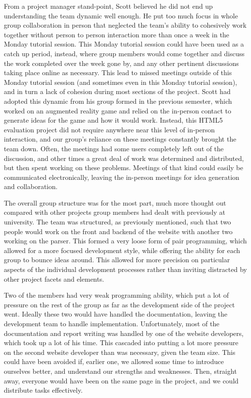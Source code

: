\documentclass[10pt]{article}
\begin{document}
From a project manager stand-point, Scott believed he did not end up understanding the team dynamic well enough. He put too much focus in whole group collaboration in person that neglected the team's ability to cohesively work together without person to person interaction more than once a week in the Monday tutorial session. This Monday tutorial session could have been used as a catch up period, instead, where group members would come together and discuss the work completed over the week gone by, and any other pertinent discussions taking place online as necessary. This lead to missed meetings outside of this Monday tutorial session (and sometimes even in this Monday tutorial session), and in turn a lack of cohesion during most sections of the project. Scott had adopted this dynamic from his group formed in the previous semester, which worked on an augmented reality game and relied on the in-person contact to generate ideas for the game and how it would work. Instead, this HTML5 evaluation project did not require anywhere near this level of in-person interaction, and our group's reliance on these meetings constantly brought the team down. Often, the meetings had some users completely left out of the discussion, and other times a great deal of work was determined and distributed, but then spent working on these problems. Meetings of that kind could easily be communicated electronically, leaving the in-person meetings for idea generation and collaboration.

The overall group structure was for the most part, much more thought out compared with other projects group members had dealt with previously at university. The team was structured, as previously mentioned, such that two people would work on the front and backend of the website with another two working on the parser. This formed a very loose form of pair programming, which allowed for a more focused development style, while offering the ability for each group to bounce ideas around. This allowed for more precision on particular aspects of the individual development processes rather than inviting distracted by other project facets and elements.

Two of the members had very weak programming ability, which put a lot of pressure on the rest of the group as far as the development side of the project went. Ideally these two would have handled the documentation, leaving the development team to handle implementation. Unfortunately, most of the documentation and report writing was handled by one of the website developers, which took up a lot of his time. This cascaded into putting a lot more pressure on the second website developer than was necessary, given the team size. This could have been avoided if, earlier one, we allowed some time to introduce ourselves better, and understand our strengths and weaknesses. Then, straight away, everyone would have been on the same page in the project, and we could distribute tasks effectively.
\end{document}
